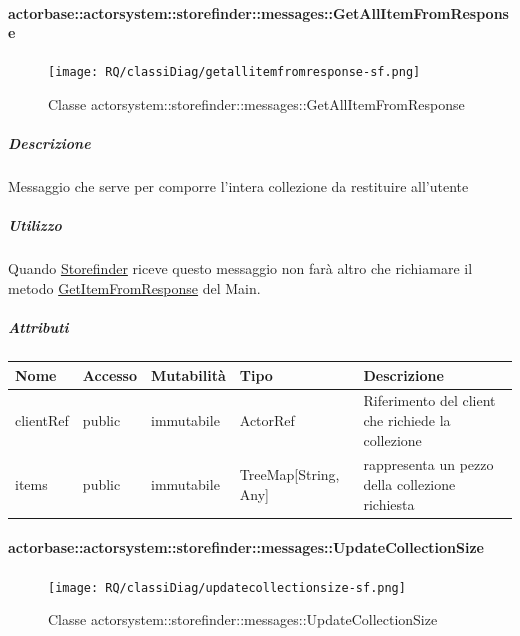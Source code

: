 \documentclass{scalatekids-article}
\begin{document}
\paragraph{actorbase::actorsystem::storefinder::messages::GetAllItemFromResponse}
\label{sec:actorbase::actorsystem::storefinder::messages::GetAllItemFromResponse}

\begin{figure}[H]
   \begin{center}
     \texttt{[image: RQ/classiDiag/getallitemfromresponse-sf.png]}
     \caption{Classe actorsystem::storefinder::messages::GetAllItemFromResponse}
   \end{center}
 \end{figure}

\subparagraph{Descrizione}

Messaggio che serve per comporre l'intera collezione da restituire all'utente

\subparagraph{Utilizzo}

Quando \hyperref[sec:actorbase::actorsystem::storefinder::Storefinder]{Storefinder}
riceve questo messaggio non farà altro che richiamare il metodo
\hyperref[sec:actorbase::actorsystem::main::messages::GetItemFromResponse]{GetItemFromResponse} del Main.

\subparagraph{Attributi}
\begin{tabular}{| p{3cm} | p{1.5cm} | p{2cm} | p{2cm} | p{8.5cm} |}
  \hline
  Nome & Accesso & Mutabilità & Tipo & Descrizione\\
  \hline
  clientRef & public & immutabile & ActorRef & Riferimento del client che richiede la collezione\\
  \hline
  items & public & immutabile & TreeMap[String, Any] & rappresenta un pezzo della collezione richiesta\\
  \hline
\end{tabular}

\paragraph{actorbase::actorsystem::storefinder::messages::UpdateCollectionSize}
\label{sec:actorbase::actorsystem::storefinder::messages::UpdateCollectionSize}

\begin{figure}[H]
   \begin{center}
     \texttt{[image: RQ/classiDiag/updatecollectionsize-sf.png]}
     \caption{Classe actorsystem::storefinder::messages::UpdateCollectionSize}
   \end{center}
 \end{figure}
\end{document}

